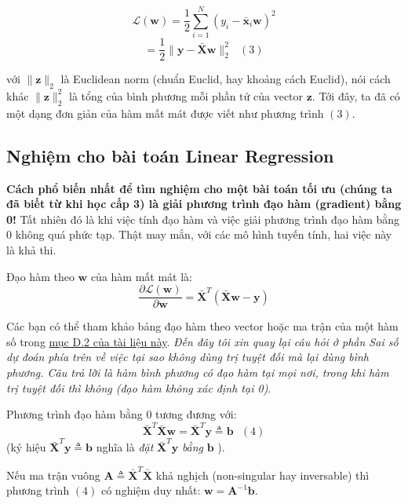 $$ 
\mathcal{L}(\mathbf{w})  
= \frac{1}{2}\sum_{i=1}^N (y_i - \mathbf{\bar{x}}_i\mathbf{w})^2 $$ 
$$ 
= \frac{1}{2} \|\mathbf{y} - \mathbf{\bar{X}}\mathbf{w} \|_2^2  
~~~(3) 
$$ 
 
với $ \| \mathbf{z} \|_2 $ là Euclidean norm (chuẩn Euclid, hay khoảng cách Euclid), nói cách khác $ \| \mathbf{z} \|_2^2 $ là tổng của bình phương mỗi phần tử của vector $\mathbf{z}$. Tới đây, ta đã có một dạng đơn giản của hàm mất mát được viết như phương trình $(3)$. 
 
 
 
 
 
\subsection{Nghiệm cho bài toán Linear Regression}
 
\textbf{Cách phổ biến nhất để tìm nghiệm cho một bài toán tối ưu (chúng ta đã biết từ khi học cấp 3) là giải phương trình đạo hàm (gradient) bằng 0!} Tất nhiên đó là khi việc tính đạo hàm và việc giải phương trình đạo hàm bằng 0 không quá phức tạp. Thật may mắn, với các mô hình tuyến tính, hai việc này là khả thi.  
 
Đạo hàm theo $\mathbf{w} $ của hàm mất mát là:  
$$ 
\frac{\partial{\mathcal{L}(\mathbf{w})}}{\partial{\mathbf{w}}}  
= \mathbf{\bar{X}}^T(\mathbf{\bar{X}}\mathbf{w} - \mathbf{y})  
$$ 
 
Các bạn có thể tham khảo bảng đạo hàm theo vector hoặc ma trận của một hàm số trong \href{https://ccrma.stanford.edu/~dattorro/matrixcalc.pdf}{mục D.2 của tài liệu này}. \textit{Đến đây tôi xin quay lại câu hỏi ở phần Sai số dự đoán phía trên về việc tại sao không dùng trị tuyệt đối mà lại dùng bình phương. Câu trả lời là hàm bình phương có đạo hàm tại mọi nơi, trong khi hàm trị tuyệt đối thì không (đạo hàm không xác định tại 0)}. 
 
Phương trình đạo hàm bằng 0 tương đương với:  
$$ 
\mathbf{\bar{X}}^T\mathbf{\bar{X}}\mathbf{w} = \mathbf{\bar{X}}^T\mathbf{y} \triangleq \mathbf{b}  
~~~ (4) 
$$ 
(ký hiệu $\mathbf{\bar{X}}^T\mathbf{y} \triangleq \mathbf{b} $ nghĩa là \textit{đặt} $\mathbf{\bar{X}}^T\mathbf{y}$ \textit{bằng} $\mathbf{b}$ ). 
 
Nếu ma trận vuông $ \mathbf{A} \triangleq \mathbf{\bar{X}}^T\mathbf{\bar{X}}$ khả nghịch (non-singular hay inversable) thì phương trình $(4)$ có nghiệm duy nhất: $ \mathbf{w} = \mathbf{A}^{-1}\mathbf{b}  $. 
 

